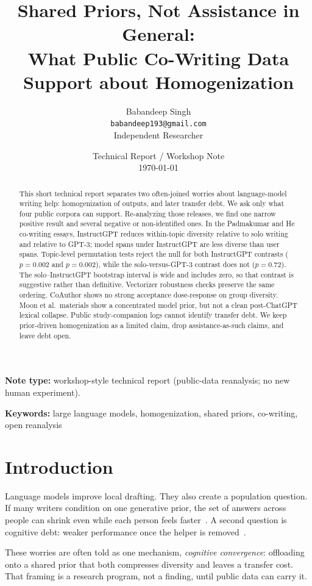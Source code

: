 \documentclass[11pt]{article}
\title{Shared Priors, Not Assistance in General:\\
What Public Co-Writing Data Support about Homogenization}
\author{
Babandeep Singh\\
\texttt{babandeep193@gmail.com}\\
Independent Researcher
}
\date{Technical Report / Workshop Note\\[0.25em]\today}
\begin{document}
\maketitle

\begin{abstract}
This short technical report separates two often-joined worries about language-model writing help: homogenization of outputs, and later transfer debt.
We ask only what four public corpora can support.
Re-analyzing those releases, we find one narrow positive result and several negative or non-identified ones.
In the Padmakumar and He co-writing essays, InstructGPT reduces within-topic diversity relative to solo writing and relative to GPT-3; model spans under InstructGPT are less diverse than user spans.
Topic-level permutation tests reject the null for both InstructGPT contrasts ($p=0.002$ and $p=0.002$), while the solo-versus-GPT-3 contrast does not ($p=0.72$).
The solo--InstructGPT bootstrap interval is wide and includes zero, so that contrast is suggestive rather than definitive.
Vectorizer robustness checks preserve the same ordering.
CoAuthor shows no strong acceptance dose-response on group diversity.
Moon et al.\ materials show a concentrated model prior, but not a clean post-ChatGPT lexical collapse.
Public study-companion logs cannot identify transfer debt.
We keep prior-driven homogenization as a limited claim, drop assistance-as-such claims, and leave debt open.
\end{abstract}

\noindent\textbf{Note type:} workshop-style technical report (public-data reanalysis; no new human experiment).

\noindent\textbf{Keywords:} large language models, homogenization, shared priors, co-writing, open reanalysis

\section{Introduction}

Language models improve local drafting.
They also create a population question.
If many writers condition on one generative prior, the set of answers across people can shrink even while each person feels faster~\citep{padmakumar2024diversity,anderson2024homogenization,acemoglu2026collapse}.
A second question is cognitive debt: weaker performance once the helper is removed~\citep{kosmyna2025eeg,barcaui2025crutch,risko2016offloading,parasuraman1997automation}.

These worries are often told as one mechanism, \emph{cognitive convergence}: offloading onto a shared prior that both compresses diversity and leaves a transfer cost.
That framing is a research program, not a finding, until public data can carry it.
\end{document}

